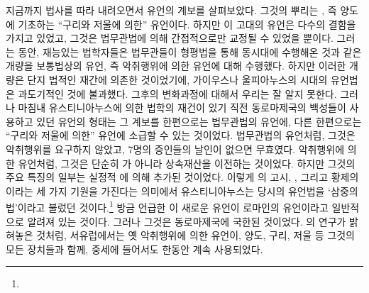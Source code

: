 지금까지 법사를 따라 내려오면서 유언의 계보를 살펴보았다.
그것의 뿌리는 , 즉 양도에 기초하는 ``구리와 저울에 의한'' 유언이다.
하지만 이 고대의 유언은 다수의 결함을 가지고 있었고,
그것은 법무관법에 의해 간접적으로만 교정될 수 있었을 뿐이다.
그러는 동안, 재능있는 법학자들은
법무관들이 형평법을 통해 동시대에 수행해온 것과 같은 개량을
보통법상의 유언, 즉 악취행위에 의한 유언에 대해 수행했다.
하지만 이러한 개량은 단지 법적인 재간에 의존한 것이었기에,
가이우스나 울피아누스의 시대의 유언법은 과도기적인 것에 불과했다.
그후의 변화과정에 대해서 우리는 잘 알지 못한다.
그러나 마침내 유스티니아누스에 의한 법학의 재건이 있기 직전
동로마제국의 백성들이 사용하고 있던 유언의 형태는
그 계보를 한편으로는 법무관법의 유언에,
다른 한편으로는 ``구리와 저울에 의한'' 유언에 소급할 수 있는
것이었다.
법무관법의 유언처럼, 그것은 악취행위를 요구하지 않았고,
7명의 증인들의 날인이 없으면 무효였다.
악취행위에 의한 유언처럼, 그것은 단순히 가 아니라
상속재산을 이전하는 것이었다.
하지만 그것의 주요 특징의 일부는 실정적 에 의해 추가된 것이었다.
이렇게 의 고시, , 그리고 황제의 이라는
세 가지 기원을 가진다는 의미에서
유스티니아누스는 당시의 유언법을
`삼중의 법'이라고 불렀던 것이다.\footnote{}
방금 언급한 이 새로운 유언이
로마인의 유언이라고
일반적으로
알려져 있는 것이다.
그러나 그것은 동로마제국에 국한된 것이었다.
의 연구가 밝혀놓은 것처럼,
서유럽에서는 옛 악취행위에 의한 유언이,
양도, 구리, 저울 등 그것의 모든 장치들과 함께,
중세에 들어서도 한동안 계속 사용되었다.


